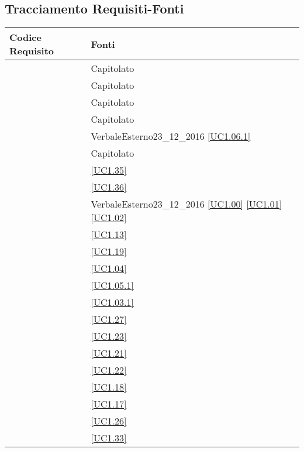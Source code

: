 \subsection{Tracciamento Requisiti-Fonti}

\begin{longtable}{|P{6cm}|P{6cm}|}
	\hline \textbf{Codice Requisito} & \textbf{Fonti}\\
	\hline {} & Capitolato \\
	\hline {} & Capitolato \\
	\hline {} & Capitolato \\
	\hline {} & Capitolato \\
	\hline {} & VerbaleEsterno23\_12\_2016 \linebreak \ref{UC1.06.1}  \\	
	\hline {} & Capitolato \\
	\hline {} & \ref{UC1.35} \\
	\hline {} & \ref{UC1.36} \\
	\hline {} & VerbaleEsterno23\_12\_2016 \linebreak \ref{UC1.00} \linebreak \ref{UC1.01} \linebreak \ref{UC1.02} \\
	\hline {} & \ref{UC1.13} \\
	\hline {} & \ref{UC1.19} \\
	\hline {} & \ref{UC1.04}  \\
	\hline {} & \ref{UC1.05.1} \\
	\hline {} & \ref{UC1.03.1} \\
	\hline {} & \ref{UC1.27} \\
	\hline {} & \ref{UC1.23} \\
	\hline {} & \ref{UC1.21} \\
	\hline {} & \ref{UC1.22} \\
	\hline {} & \ref{UC1.18} \\
	\hline {} & \ref{UC1.17} \\
	\hline {} & \ref{UC1.26} \\
	\hline {} & \ref{UC1.33} \\

\end{longtable}

